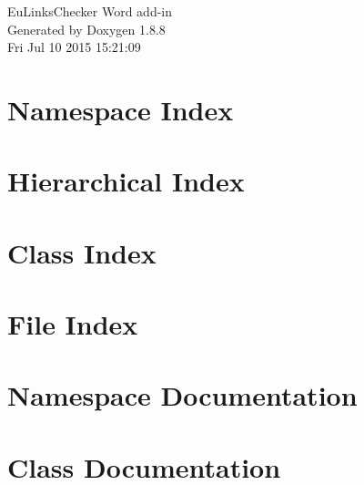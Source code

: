 \documentclass[twoside]{book}
\newcommand{\+}{\discretionary{\mbox{\scriptsize$\hookleftarrow$}}{}{}}
\newcommand{\clearemptydoublepage}{%
  \newpage{\pagestyle{empty}\cleardoublepage}%
}
\begin{document}
\hypersetup{pageanchor=false,
             bookmarks=true,
             bookmarksnumbered=true,
             pdfencoding=unicode
            }
\begin{titlepage}
\vspace*{7cm}
\begin{center}%
{\Large Eu\+Links\+Checker Word add-\/in }\\
\vspace*{1cm}
{\large Generated by Doxygen 1.8.8}\\
\vspace*{0.5cm}
{\small Fri Jul 10 2015 15:21:09}\\
\end{center}
\end{titlepage}
\clearemptydoublepage
\tableofcontents
\clearemptydoublepage
{}
\hypersetup{pageanchor=true}

\chapter{Namespace Index}

\chapter{Hierarchical Index}

\chapter{Class Index}

\chapter{File Index}

\chapter{Namespace Documentation}



\chapter{Class Documentation}










\end{document}
